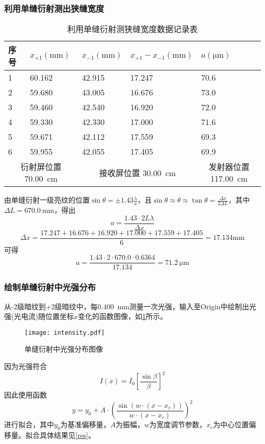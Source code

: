 \documentclass[]{../template/Report}%
\begin{document}
\begin{fullreportonly}
\subsubsection{利用单缝衍射测出狭缝宽度}
\begin{table}[H]
\centering
\caption{利用单缝衍射测狭缝宽度数据记录表}
\label{tab:a}
\begin{tabular}{|ll|ll|l|}
\hline
\multicolumn{1}{|l|}{序号} & $x_{+1}(\si{\mm})$ & \multicolumn{1}{l|}{$x_{-1}(\si{\mm})$} & $x_{+1} - x_{-1}(\si{\mm})$ & $a(\si{\micro \meter})$                    \\ \hline
\multicolumn{1}{|l|}{1} & 60.162 & \multicolumn{1}{l|}{42.915} & 17.247 & 70.6 \\ \hline
\multicolumn{1}{|l|}{2} & 59.680 & \multicolumn{1}{l|}{43.005} & 16.676 & 73.0 \\ \hline
\multicolumn{1}{|l|}{3} & 59.460 & \multicolumn{1}{l|}{42.540} & 16.920 & 72.0 \\ \hline
\multicolumn{1}{|l|}{4} & 59.330 & \multicolumn{1}{l|}{42.330} & 17.000 & 71.6 \\ \hline
\multicolumn{1}{|l|}{5} & 59.671 & \multicolumn{1}{l|}{42.112} & 17.559 & 69.3 \\ \hline
\multicolumn{1}{|l|}{6} & 59.955 & \multicolumn{1}{l|}{42.055} & 17.405 & 69.9 \\ \hline
\multicolumn{2}{|c|}{衍射屏位置 \SI{70.00}{\cm}}   & \multicolumn{2}{c|}{接收屏位置 \SI{30.00}{\cm}}                            & \multicolumn{1}{c|}{发射器位置\SI{117.00}{\cm}} \\ \hline
\end{tabular}%
\end{table}
由单缝衍射一级亮纹的位置$\sin \theta = \pm 1.43 \frac{\lambda}{a}$，且$\sin \theta \approx \theta \approx \tan \theta = \frac{\Delta x}{2\Delta L}$，其中$\Delta L = \SI{670.0}{\mm}$，得出
\[
a = \frac{1.43 \cdot 2L\lambda}{\Delta x}
\]
\[
\overline{\Delta x} = \frac{17.247 + 16.676 + 16.920 + 17.000 + 17.559 + 17.405}{6} = 17.134 \si{\mm}
\]
可得
\[a = \frac{1.43 \cdot 2 \cdot 670.0 \cdot 0.6364}{17.134} = \SI{71.2}{\micro \meter}\]
\subsubsection{绘制单缝衍射中光强分布}
从-2级暗纹到+2级暗纹中，每\SI{0.400}{\mm}测量一次光强，输入至\textrm{Origin}中绘制出光强(光电流)随位置坐标$x$变化的函数图像，如\cref{fig:intensity}所示。
\begin{figure}[H]
    \centering
    \texttt{[image: intensity.pdf]}
    \caption{单缝衍射中光强分布图像}
    \label{fig:intensity}
\end{figure}
因为光强符合
\[
I(x) = I_0\left[\frac{\sin \beta}{\beta}\right]^2
\]
因此使用函数
\[
y = y_0 + A\cdot\left(\frac{\sin(w \cdot (x - x_c))}{w \cdot (x - x_c)}\right)^2
\]
进行拟合，其中$y_0$为基准偏移量，$A$为振幅，$w$为宽度调节参数，$x_c$为中心位置偏移量。拟合具体结果见\cref{res}。

\end{fullreportonly}
\end{document}
